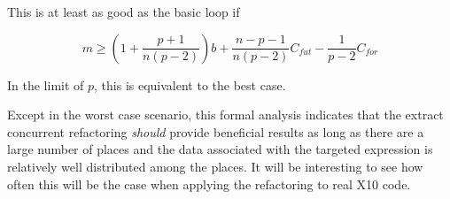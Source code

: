 This is at least as good as the basic loop if 

\vspace{-.05in}
\[m \geq (1 + \frac{p+1}{n(p-2)})b + \frac{n-p-1}{n(p-2)}C_{fut} -
\frac{1}{p-2}C_{for}\]
\vspace{-.1in}

In the limit of $p$, this is equivalent to the best case.

Except in the worst case scenario, this formal analysis indicates that the
extract concurrent refactoring \emph{should} provide beneficial results as long
as there are a large number of places and the data associated with the targeted
expression is relatively well distributed among the places. It will be
interesting to see how often this will be the case when applying the
refactoring to real X10 code.
